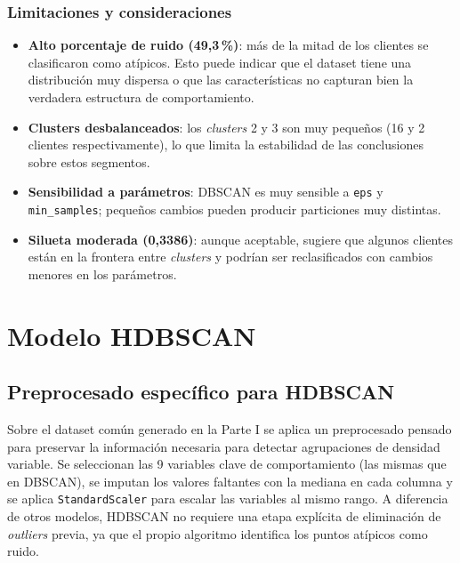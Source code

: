 \documentclass[11pt,a4paper]{article}
\begin{document}
\subsubsection{Limitaciones y consideraciones}

\begin{itemize}
    \item \textbf{Alto porcentaje de ruido (49,3\,\%)}: más de la mitad de los clientes se clasificaron como atípicos. Esto puede indicar que el dataset tiene una distribución muy dispersa o que las características no capturan bien la verdadera estructura de comportamiento.
    \item \textbf{Clusters desbalanceados}: los \textit{clusters} 2 y 3 son muy pequeños (16 y 2 clientes respectivamente), lo que limita la estabilidad de las conclusiones sobre estos segmentos.
    \item \textbf{Sensibilidad a parámetros}: DBSCAN es muy sensible a \texttt{eps} y \texttt{min\_samples}; pequeños cambios pueden producir particiones muy distintas.
    \item \textbf{Silueta moderada (0,3386)}: aunque aceptable, sugiere que algunos clientes están en la frontera entre \textit{clusters} y podrían ser reclasificados con cambios menores en los parámetros.
\end{itemize}

\section{Modelo HDBSCAN}
\label{sec:hdbscan}

\subsection{Preprocesado específico para HDBSCAN}

Sobre el dataset común generado en la Parte I se aplica un preprocesado pensado para preservar la información necesaria para detectar agrupaciones de densidad variable. Se seleccionan las 9 variables clave de comportamiento (las mismas que en DBSCAN), se imputan los valores faltantes con la mediana en cada columna y se aplica \texttt{StandardScaler} para escalar las variables al mismo rango. A diferencia de otros modelos, HDBSCAN no requiere una etapa explícita de eliminación de \textit{outliers} previa, ya que el propio algoritmo identifica los puntos atípicos como ruido.
\end{document}
